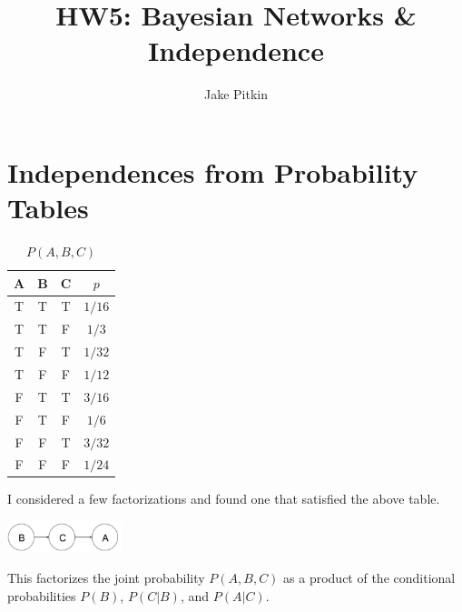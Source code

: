 \documentclass[fleqn]{hw}
\title{HW5: Bayesian Networks \& Independence}
\institute{University of Utah}
\author{Jake Pitkin}
\begin{document}
\maketitle

\section{Independences from Probability Tables}

\begin{table}[H]
\centering	
\begin{tabular}{|ccc|c|}
\hline
{\bf A} & {\bf B} & {\bf C} & $p$ \\
\hline
T & T & T & $1/16$ \\
T & T & F & $1/3$ \\
T & F & T & $1/32$ \\
T & F & F & $1/12$ \\
F & T & T & $3/16$ \\
F & T & F & $1/6$ \\
F & F & T & $3/32$ \\
F & F & F & $1/24$ \\
\hline
\end{tabular}
\caption{$P(A, B, C)$}
\end{table}

I considered a few factorizations and found one that satisfied the above table.

\begin{center}
	\includegraphics[width=0.25\textwidth]{p1}
\end{center}

This factorizes the joint probability $P(A, B, C)$ as a product of the conditional probabilities $P(B)$, $P(C | B)$, and $P(A | C)$. 
\end{document}
